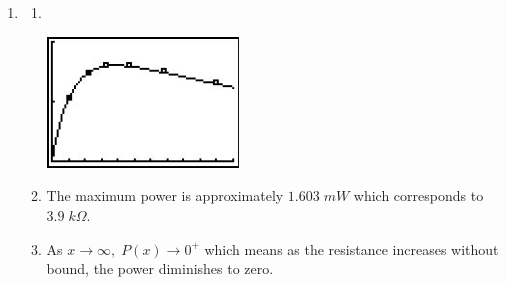 \begin{enumerate}
\begin{enumerate}
\end{enumerate}

\item \begin{enumerate}

\item $~$

\centerline{\includegraphics[width=2in]{./RationalsGraphics/CIRCRAT.jpg}}

\item The maximum power is approximately $1.603 \; mW$ which corresponds to $3.9 \; k\Omega$.

\item As $x \rightarrow \infty, \; P(x) \rightarrow 0^{+}$ which means as the resistance increases without bound, the power diminishes to zero.

\end{enumerate}

\end{enumerate}

\closegraphsfile